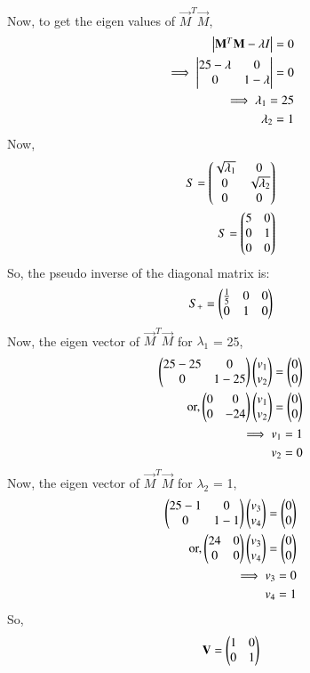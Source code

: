 \documentclass[journal,12pt,twocolumn]{IEEEtran}
\begin{document}
Now, to get the eigen values of $\vec{M}^T \vec{M}$,
\begin{align}
\begin{vmatrix}\mathbf{M}^T \mathbf{M} - \lambda I\end{vmatrix} = 0\\
\implies \begin{vmatrix}25-\lambda & 0\\0 & 1-\lambda\end{vmatrix} = 0\\
\implies \lambda_1 = 25\\
\lambda_2 = 1
\end{align}
Now,
\begin{align}
S= \begin{pmatrix}\sqrt{\lambda_1} & 0\\0 & \sqrt{\lambda_2}\\0 & 0\end{pmatrix}\\
S= \begin{pmatrix}5 & 0\\0 & 1\\0 & 0\end{pmatrix}
\end{align}
So, the pseudo inverse of the diagonal matrix is:
\begin{align}
S_+= \begin{pmatrix}\frac{1}{5} & 0 & 0\\0 & 1 & 0\end{pmatrix}
\end{align}
Now, the eigen vector of $\vec{M}^T \vec{M}$ for $\lambda_1$ = 25,
\begin{align}
\begin{pmatrix}25-25 & 0\\0 & 1-25\end{pmatrix} \begin{pmatrix}v_1\\v_2\end{pmatrix} = \begin{pmatrix}0\\0\end{pmatrix}\\
\text{or,} \begin{pmatrix}0 & 0\\0 & -24\end{pmatrix} \begin{pmatrix}v_1\\v_2\end{pmatrix} = \begin{pmatrix}0\\0\end{pmatrix}\\
\implies v_1 = 1\\
v_2 = 0
\end{align}
Now, the eigen vector of $\vec{M}^T \vec{M}$ for $\lambda_2$ = 1,
\begin{align}
\begin{pmatrix}25-1& 0\\0 & 1-1\end{pmatrix} \begin{pmatrix}v_3\\v_4\end{pmatrix} = \begin{pmatrix}0\\0\end{pmatrix}\\
\text{or,} \begin{pmatrix}24 & 0\\0 & 0\end{pmatrix} \begin{pmatrix}v_3\\v_4\end{pmatrix} = \begin{pmatrix}0\\0\end{pmatrix}\\
\implies v_3 = 0\\
v_4 = 1
\end{align}
So,
\begin{align}
\mathbf{V} = \begin{pmatrix}1 & 0\\0 & 1\end{pmatrix}
\end{align}
\end{document}
